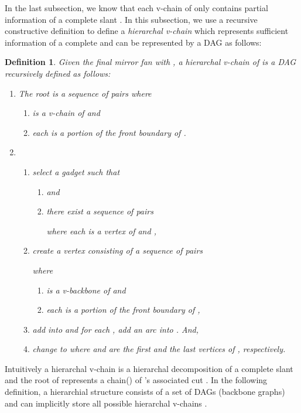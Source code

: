 \documentclass[11pt]{article}
\newtheorem{definition}[figure]{Definition}
\begin{document}
In the last subsection,
we know that each v-chain of  only contains partial information of a
complete slant .
In this subsection, we use a recursive constructive definition
to define a \emph{hierarchal v-chain}
which represents
sufficient information of a complete   and
can be represented by a DAG
as follows:
\begin{definition}\label{def:h-v-chain}
Given the final mirror fan  with ,
a \emph{hierarchal v-chain}  of  is a DAG
recursively defined as follows:
\begin{enumerate}
\item The \emph{root} 
is a sequence of pairs 
where
\begin{enumerate}
\item  is a v-chain
 of  and

\item each  is a portion of the front boundary  of .
\end{enumerate}


\item 

\begin{enumerate}
\item select a gadget  such that
\begin{enumerate}
\item  and
\item there exist a sequence of pairs

where each  is a vertex of  and
,
\end{enumerate}



\item create a vertex  consisting of a sequence of pairs

where
\begin{enumerate}
\item 
is a v-backbone of  and
\item each  is a portion
of the front boundary  of ,
\end{enumerate}

\item add  into  and
for each ,
add an arc  into . And,

\item change  to 
where  and  are the first and the last vertices of , respectively.

\end{enumerate}

\end{enumerate}


\end{definition}
Intuitively a hierarchal v-chain  is a hierarchal decomposition of
a complete slant   and
the root  of  represents a chain() of 's associated cut .
In the following definition,
a hierarchial structure  consists of a set of DAGs (backbone graphs)
and  can implicitly store all possible hierarchal v-chains .
\end{document}

